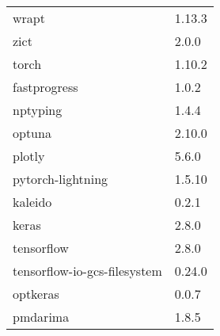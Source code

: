 \begin{table}[h]
\begin{tabular}{|l|l|}
    wrapt                        & 1.13.3    \\
    zict                         & 2.0.0     \\
    torch                        & 1.10.2    \\
    fastprogress                 & 1.0.2     \\
    nptyping                     & 1.4.4     \\
    optuna                       & 2.10.0    \\
    plotly                       & 5.6.0     \\
    pytorch-lightning            & 1.5.10    \\
    kaleido                      & 0.2.1     \\
    keras                        & 2.8.0     \\
    tensorflow                   & 2.8.0     \\
    tensorflow-io-gcs-filesystem & 0.24.0    \\
    optkeras                     & 0.0.7     \\
    pmdarima                     & 1.8.5     \\
    \hline
  \end{tabular}
\end{table}
